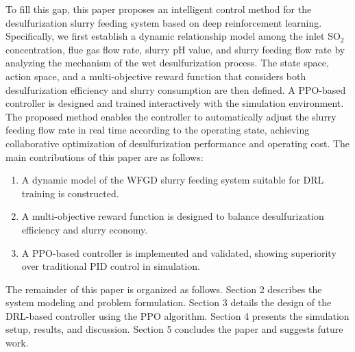 \documentclass[12pt,a4paper]{article}
\begin{document}
To fill this gap, this paper proposes an intelligent control method for the desulfurization slurry feeding system based on deep reinforcement learning. Specifically, we first establish a dynamic relationship model among the inlet SO\(_2\) concentration, flue gas flow rate, slurry pH value, and slurry feeding flow rate by analyzing the mechanism of the wet desulfurization process. The state space, action space, and a multi-objective reward function that considers both desulfurization efficiency and slurry consumption are then defined. A PPO-based controller is designed and trained interactively with the simulation environment. The proposed method enables the controller to automatically adjust the slurry feeding flow rate in real time according to the operating state, achieving collaborative optimization of desulfurization performance and operating cost. The main contributions of this paper are as follows:
\begin{enumerate}
    \item A dynamic model of the WFGD slurry feeding system suitable for DRL training is constructed.
    \item A multi-objective reward function is designed to balance desulfurization efficiency and slurry economy.
    \item A PPO-based controller is implemented and validated, showing superiority over traditional PID control in simulation.
\end{enumerate}

The remainder of this paper is organized as follows. Section 2 describes the system modeling and problem formulation. Section 3 details the design of the DRL-based controller using the PPO algorithm. Section 4 presents the simulation setup, results, and discussion. Section 5 concludes the paper and suggests future work.
\end{document}
